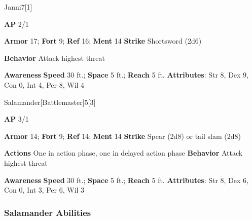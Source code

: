 \begin{monsection}{Janni}{7}[1]
\vspace{-1em}\vspace{-1em}
\begin{spellcontent}
\begin{spelltargetinginfo}
{\textbf{AP} 2/1}

\pari \textbf{Armor} 17;
\textbf{Fort} 9;
\textbf{Ref} 16;
\textbf{Ment} 14
\pari \textbf{Strike} Shortsword  (2d6)



\pari \textbf{Behavior} Attack highest threat
\end{spelltargetinginfo}
\end{spellcontent}

\begin{monsterfooter}
\pari \textbf{Awareness} 
\pari \textbf{Speed} 30 ft.;
\textbf{Space} 5 ft.;
\textbf{Reach} 5 ft.
\pari \textbf{Attributes}:
Str 8,
Dex 9,
Con 0,
Int 4,
Per 8,
Wil 4
\end{monsterfooter}
\end{monsection}

\begin{monsection}{Salamander}[Battlemaster]{5}[3]
\vspace{-1em}\vspace{-1em}
\begin{spellcontent}
\begin{spelltargetinginfo}
{\textbf{AP} 3/1}

\pari \textbf{Armor} 14;
\textbf{Fort} 9;
\textbf{Ref} 14;
\textbf{Ment} 14
\pari \textbf{Strike} Spear  (2d8) or tail slam  (2d8)


\pari \textbf{Actions} One in action phase, one in delayed action phase
\pari \textbf{Behavior} Attack highest threat
\end{spelltargetinginfo}
\end{spellcontent}

\begin{monsterfooter}
\pari \textbf{Awareness} 
\pari \textbf{Speed} 30 ft.;
\textbf{Space} 5 ft.;
\textbf{Reach} 5 ft.
\pari \textbf{Attributes}:
Str 8,
Dex 6,
Con 0,
Int 3,
Per 6,
Wil 3
\end{monsterfooter}
\end{monsection}


\subsubsection{Salamander Abilities}

